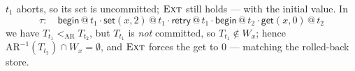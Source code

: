 \documentclass[manuscript,nonacm]{acmart}
\makeatletter
\theoremstyle{acmdefinition}
\newcommand{\bbegin}{\textsf{begin}}
\newcommand{\retry}{\textsf{retry}}
\newcommand{\getev}[3]{\textsf{get}(#1,#2)\,@\,#3}
\newcommand{\setev}[3]{\textsf{set}(#1,#2)\,@\,#3}
\makeatother
\begin{document}
\begin{example}
$t_1$ aborts, so its set is uncommitted; $\textsc{Ext}$ still holds --- with the
initial value. In
\[
\tau:\quad \bbegin\,@\,t_1 \cdot \setev{x}{2}{t_1} \cdot \retry\,@\,t_1
      \cdot \bbegin\,@\,t_2 \cdot \getev{x}{0}{t_2}
\]
we have $T_{t_1} <_{\mathrm{AR}} T_{t_2}$, but $T_{t_1}$ is \emph{not} committed, so
$T_{t_1} \notin W_x$; hence $\mathrm{AR}^{-1}(T_{t_2}) \cap W_x = \emptyset$, and
$\textsc{Ext}$ forces the get to $0$ --- matching the rolled-back store.
\end{example}
\end{document}
